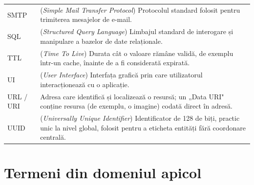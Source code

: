 \begin{longtable}{@{}p{2.6cm} p{10.6cm}@{}}
SMTP & (\textit{Simple Mail Transfer Protocol}) Protocolul standard folosit pentru trimiterea mesajelor de e-mail. \\
SQL & (\textit{Structured Query Language}) Limbajul standard de interogare și manipulare a bazelor de date relaționale. \\
TTL & (\textit{Time To Live}) Durata cât o valoare rămâne validă, de exemplu într-un cache, înainte de a fi considerată expirată. \\
UI & (\textit{User Interface}) Interfața grafică prin care utilizatorul interacționează cu o aplicație. \\
URL / URI & Adresa care identifică și localizează o resursă; un „Data URI" conține resursa (de exemplu, o imagine) codată direct în adresă. \\
UUID & (\textit{Universally Unique Identifier}) Identificator de 128 de biți, practic unic la nivel global, folosit pentru a eticheta entități fără coordonare centrală. \\
\end{longtable}

\section*{Termeni din domeniul apicol}

